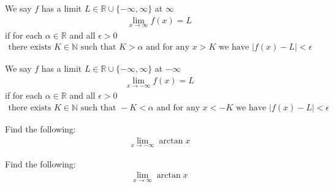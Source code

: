 \begin{definition}
We say $f$ has a limit $L \in \mathbb{R} \cup \{-\infty, \infty\}$ at $\infty$ 
\begin{align*}
    \lim_{x \longrightarrow \infty} f(x) = L
\end{align*}
if for each $\alpha \in \mathbb{R}$ and all $\epsilon > 0$ 
\begin{align*}
    \text{there exists} \hspace{4pt} K \in \mathbb{N} \hspace{4pt} \text{such that} \hspace{4pt} K > \alpha \hspace{4pt} \text{and for any} \hspace{4pt} x > K \hspace{4pt} \text{we have} \hspace{4pt} \lvert f(x) - L \rvert < \epsilon
\end{align*}
\end{definition}

\begin{definition}
We say $f$ has a limit $L \in \mathbb{R} \cup \{-\infty, \infty\}$ at $-\infty$ 
\begin{align*}
    \lim_{x \longrightarrow -\infty} f(x) = L
\end{align*}
if for each $\alpha \in \mathbb{R}$ and all $\epsilon > 0$ 
\begin{align*}
    \text{there exists} \hspace{4pt} K \in \mathbb{N} \hspace{4pt} \text{such that} \hspace{4pt} -K < \alpha \hspace{4pt} \text{and for any} \hspace{4pt} x < -K \hspace{4pt} \text{we have} \hspace{4pt} \lvert f(x) - L \rvert < \epsilon
\end{align*}
\end{definition}

\begin{exercise}
Find the following:
\begin{align*}
    \lim_{x \longrightarrow -\infty} \arctan x
\end{align*}
\end{exercise}

\begin{exercise}
Find the following:
\begin{align*}
    \lim_{x \longrightarrow \infty} \arctan x
\end{align*}
\end{exercise}

